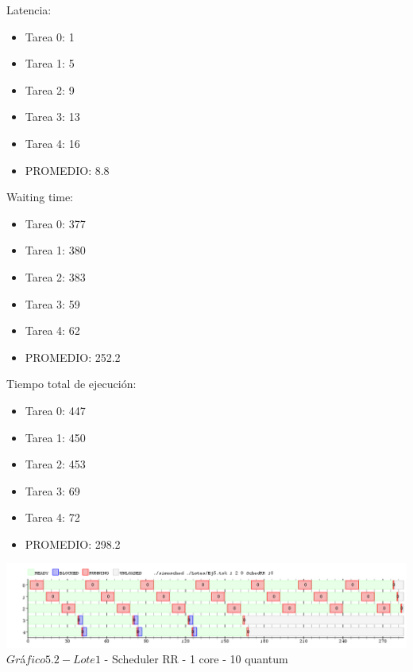 \indent Latencia:\
\begin{itemize}
 \item Tarea 0: 1
 \item Tarea 1: 5
 \item Tarea 2: 9
 \item Tarea 3: 13
 \item Tarea 4: 16
 \item PROMEDIO: 8.8
\end{itemize}
\indent Waiting time:\
\begin{itemize}
 \item Tarea 0: 377
 \item Tarea 1: 380
 \item Tarea 2: 383
 \item Tarea 3: 59
 \item Tarea 4: 62
 \item PROMEDIO: 252.2
\end{itemize}
\indent Tiempo total de ejecuci\'{o}n:\
\begin{itemize}
 \item Tarea 0: 447
 \item Tarea 1: 450
 \item Tarea 2: 453
 \item Tarea 3: 69
 \item Tarea 4: 72
 \item PROMEDIO: 298.2
\end{itemize}

\begin{center}
  	\includegraphics[width=450pt]{ej5quantum10.png}
	  {$Gr$\'a$fico 5.2 - Lote 1$ - Scheduler RR - 1 core - 10 quantum}	
\end{center}

